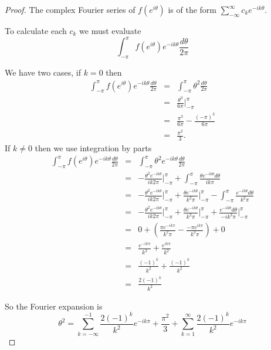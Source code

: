 \documentclass[letterpaper,twoside,11pt]{article}
\begin{document}
\begin{proof}
The complex Fourier series of $f(e^{i\theta})$ is of the form $\sum_{-\infty}^{\infty}c_ke^{-ik\theta}$.

To calculate each $c_k$ we must evaluate \begin{equation}\int_{-\pi}^{\pi} f(e^{i\theta})e^{-ik\theta}\frac{d\theta}{2\pi}\nonumber \end{equation}

We have two cases, if $k=0$ then 
\begin{eqnarray}
\int_{-\pi}^{\pi} f(e^{i\theta})e^{-ik\theta}\frac{d\theta}{2\pi} &=& \int_{-\pi}^{\pi} \theta^2\frac{d\theta}{2\pi}\nonumber 
\\ &=& \frac{\theta^3}{6\pi}\bigg|_{-\pi}^{\pi} \nonumber
\\ &=& \frac{\pi^3}{6\pi}-\frac{(-\pi)^3}{6\pi} \nonumber
\\ &=& \frac{\pi^2}{3}\nonumber.
\end{eqnarray}
If $k\not = 0$ then we use integration by parts
\begin{eqnarray}
\int_{-\pi}^{\pi} f(e^{i\theta})e^{-ik\theta}\frac{d\theta}{2\pi} &=& \int_{-\pi}^{\pi} \theta^2e^{-ik\theta}\frac{d\theta}{2\pi}\nonumber 
\\ &=& -\frac{\theta^2e^{-ik\theta}}{ik2\pi}\bigg|_{-\pi}^{\pi} + \int_{-\pi}^{\pi}\frac{\theta e^{-ik\theta}d\theta}{ik\pi}\nonumber
\\ &=& -\frac{\theta^2e^{-ik\theta}}{ik2\pi}\bigg|_{-\pi}^{\pi} + \frac{\theta e^{-ik\theta}}{k^{2}\pi}\bigg|_{-\pi}^{\pi}-\int_{-\pi}^{\pi}\frac{ e^{-ik\theta}d\theta}{k^2\pi} \nonumber
\\ &=& -\frac{\theta^2e^{-ik\theta}}{ik2\pi}\bigg|_{-\pi}^{\pi} + \frac{\theta e^{-ik\theta}}{k^{2}\pi}\bigg|_{-\pi}^{\pi}+\frac{ e^{-ik\theta}d\theta}{-ik^3\pi}\bigg|_{-\pi}^{\pi} \nonumber
\\ &=& 0 + (\frac{\pi e^{-ik\pi}}{k^{2}\pi}-\frac{-\pi e^{ik\pi}}{k^{2}\pi})+0 \nonumber
\\ &=& \frac{e^{-ik\pi}}{k^{2}}+\frac{e^{ik\pi}}{k^{2}} \nonumber
\\ &=& \frac{(-1)^k}{k^{2}}+\frac{(-1)^k}{k^{2}} \nonumber
\\ &=& \frac{2(-1)^k}{k^{2}}\nonumber
\end{eqnarray}

So the Fourier expansion is
\begin{equation}
\theta^2=\sum_{k=-\infty}^{-1} \frac{2(-1)^k}{k^{2}}e^{-ik\pi} +\frac{\pi^{2}}{3}+ \sum_{k=1}^{\infty} \frac{2(-1)^k}{k^{2}}e^{-ik\pi}\nonumber
\end{equation}


\end{proof}
\end{document}
